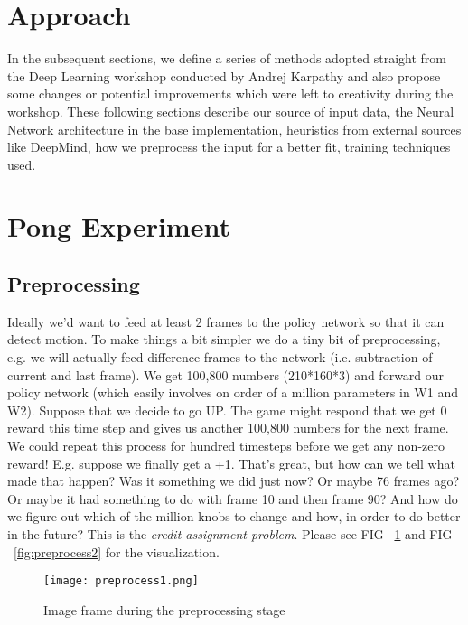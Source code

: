 \documentclass[%
 aip,
 jmp,%
 amsmath,amssymb,
 reprint,%
]{revtex4-1}
\begin{document}
\section{Approach}

In the subsequent sections, we define a series of methods adopted straight from the Deep Learning workshop conducted by Andrej Karpathy and also propose some changes or potential improvements which were left to creativity during the workshop. These following sections describe our source of input data, the Neural Network architecture in the base implementation, heuristics from external sources like DeepMind, how we preprocess the input for a better fit, training techniques used. 

\section{Pong Experiment}


\subsection{Preprocessing}


Ideally we'd want to feed at least 2 frames to the policy network so that it can detect motion. To make things a bit simpler we do a tiny bit of preprocessing, e.g. we will actually feed difference frames to the network (i.e. subtraction of current and last frame).
We get 100,800 numbers (210*160*3) and forward our policy network (which easily involves on order of a million parameters in W1 and W2). Suppose that we decide to go UP. The game might respond that we get 0 reward this time step and gives us another 100,800 numbers for the next frame. We could repeat this process for hundred timesteps before we get any non-zero reward! E.g. suppose we finally get a +1. That’s great, but how can we tell what made that happen? Was it something we did just now? Or maybe 76 frames ago? Or maybe it had something to do with frame 10 and then frame 90? And how do we figure out which of the million knobs to change and how, in order to do better in the future? This is the \textit{credit assignment problem}. Please see FIG  ~\ref{fig:preprocess1} and FIG ~\ref{fig:preprocess2} for the visualization. 

\begin{figure}[h]
\texttt{[image: preprocess1.png]}
\caption{Image frame during the preprocessing stage}
\label{fig:preprocess1}
\end{figure}
\end{document}

